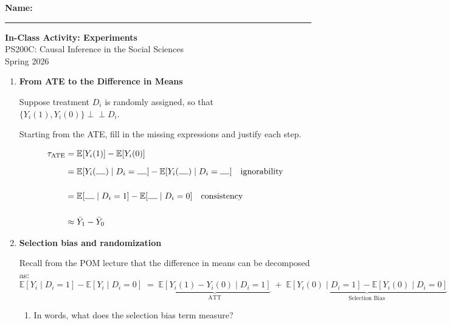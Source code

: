 \documentclass[12pt]{article}
\newcommand\E{\mathbb{E}}
\begin{document}
\noindent
\textbf{Name:} \rule{3in}{0.4pt}

\vspace{0.5cm}

\begin{center}
    {\Large \textbf{In-Class Activity: Experiments}}\\[0.2cm]
    {\large PS200C: Causal Inference in the Social Sciences}\\
    {\large Spring 2026}
\end{center}

\vspace{0.5cm}

\begin{enumerate}

\item \textbf{From ATE to the Difference in Means}

Suppose treatment $D_i$ is randomly assigned, so that $\{Y_i(1), Y_i(0)\} \perp\!\!\!\perp D_i$.

Starting from the ATE, fill in the missing expressions and justify each step.

\begin{align*}
\tau_{\text{ATE}} &= \E[Y_i(1)] - \E[Y_i(0)] \\[6pt]
    &= \E[Y_i(\rule{.4cm}{0.4pt}) \mid D_i= \rule{.4cm}{0.4pt}] - \E[Y_i(\rule{.4cm}{0.4pt}) \mid D_i=\rule{.4cm}{0.4pt}] \quad \text{ignorability} \\[14pt]
    &= \E[\rule{.4cm}{0.4pt} \mid D_i= 1] - \E[\rule{.4cm}{0.4pt} \mid D_i = 0] \quad \text{consistency} \\[14pt]
    &\approx \bar{Y}_1 - \bar{Y}_0
\end{align*}


\vspace{0.3cm}

\item \textbf{Selection bias and randomization}

Recall from the POM lecture that the difference in means can be decomposed as:
\[
\E[Y_i \mid D_i=1] - \E[Y_i \mid D_i=0] \;=\; \underbrace{\E[Y_i(1) - Y_i(0) \mid D_i=1]}_{\text{ATT}} \;+\; \underbrace{\E[Y_i(0)\mid D_i=1] - \E[Y_i(0)\mid D_i=0]}_{\text{Selection Bias}}
\]

\begin{enumerate}[label=(\alph*)]
    \item In words, what does the selection bias term measure?

    \vspace{2cm}


\end{enumerate}
\end{enumerate}
\end{document}
